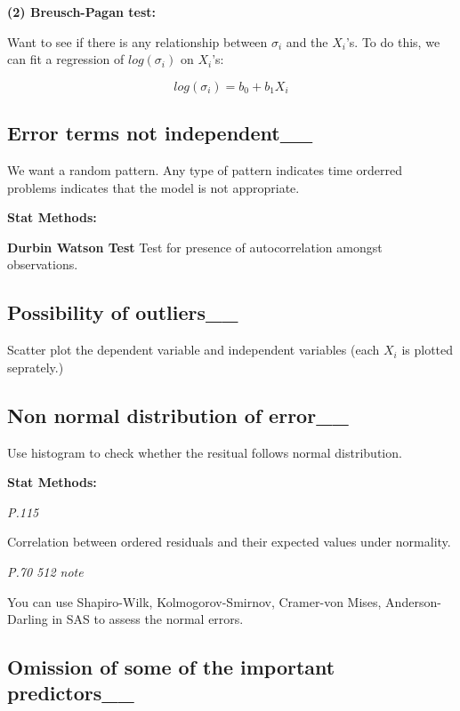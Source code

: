 \documentclass[]{book}
\begin{document}
\textbf{(2) Breusch-Pagan test:}

Want to see if there is any relationship between \(\sigma_i\) and the \(X_i\)'s. To do this, we can fit a regression of \(log(\sigma_i)\) on \(X_i\)'s:

\[log(\sigma_i)=b_0+b_1X_i\]

\hypertarget{error-terms-not-independent__}{%
\subsection{Error terms not independent\_\_}\label{error-terms-not-independent__}}

We want a random pattern. Any type of pattern indicates time orderred problems indicates that the model is not appropriate.

\textbf{Stat Methods:}

\textbf{Durbin Watson Test} Test for presence of autocorrelation amongst observations.

\hypertarget{possibility-of-outliers__}{%
\subsection{Possibility of outliers\_\_}\label{possibility-of-outliers__}}

Scatter plot the dependent variable and independent variables (each \(X_i\) is plotted seprately.)

\hypertarget{non-normal-distribution-of-error__}{%
\subsection{Non normal distribution of error\_\_}\label{non-normal-distribution-of-error__}}

Use histogram to check whether the resitual follows normal distribution.

\textbf{Stat Methods:}

\emph{P.115}

Correlation between ordered residuals and their expected values under normality.

\emph{P.70 512 note}

You can use Shapiro-Wilk, Kolmogorov-Smirnov, Cramer-von Mises, Anderson-Darling in SAS to assess the normal errors.

\hypertarget{omission-of-some-of-the-important-predictors__}{%
\subsection{Omission of some of the important predictors\_\_}\label{omission-of-some-of-the-important-predictors__}}
\end{document}
